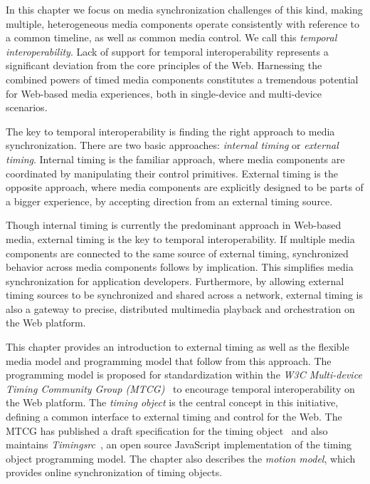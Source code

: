 \documentclass[graybox]{svmult}
\begin{document}
In this chapter we focus on media synchronization challenges of this kind,
making multiple, heterogeneous media components operate consistently with
reference to a common timeline, as well as common media control. We call this
\emph{temporal interoperability}. Lack of support for temporal
interoperability represents a significant deviation from the core principles
of the Web. Harnessing the combined powers of timed media components
constitutes a tremendous potential for Web-based media experiences, both in
single-device and multi-device scenarios.

The key to temporal interoperability is finding the right approach to media
synchronization. There are two basic approaches: \emph{internal
timing} or \emph{external timing}. Internal timing
is the familiar approach, where media components are coordinated by
manipulating their control primitives. External timing is the
opposite approach, where media components are explicitly designed to be parts
of a bigger experience, by accepting direction from an external timing source.

Though internal timing is currently the predominant approach in Web-based media, 
external timing is the key to temporal interoperability.
If multiple media components are connected to the same source of external timing,
synchronized behavior across media components follows by implication. This
simplifies media synchronization for application developers. Furthermore,
by allowing external timing sources to be synchronized and shared across a
network, external timing is also a gateway to precise, distributed multimedia
playback and orchestration on the Web platform.

This chapter provides an introduction to external timing as well as the
flexible media model and programming model that follow from this approach.
The programming model is proposed for standardization within the \emph{W3C Multi-device Timing
Community Group (MTCG)}~\cite{mtcg} to encourage temporal interoperability on
the Web platform. The \emph{timing object} is the central concept in this
initiative, defining a common interface to external timing and control for the
Web. The MTCG has published a draft specification for the timing
object~\cite{timingobject} and also maintains
\emph{Timingsrc}~\cite{timingsrc}, an open source JavaScript implementation of
the timing object programming model. The chapter also describes the
\emph{motion model}, which provides online synchronization of timing objects.
\end{document}

